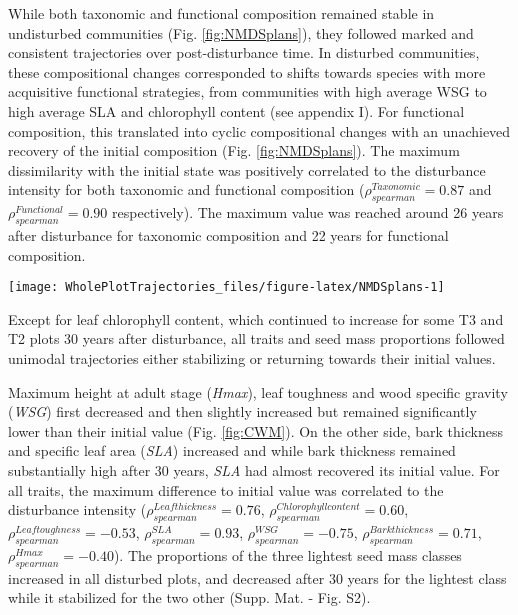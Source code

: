 \documentclass[fleqn,10pt]{ArtEcoFoG} %
\begin{document}
While both taxonomic and functional composition remained stable in
undisturbed communities (Fig. \ref{fig:NMDSplans}), they followed marked
and consistent trajectories over post-\break disturbance time. In
disturbed communities, these compositional changes corresponded to
shifts towards species with more acquisitive functional strategies, from
communities with high average WSG to high average SLA and chlorophyll
content (see appendix I). For functional composition, this translated
into cyclic compositional changes with an unachieved recovery of the
initial composition (Fig. \ref{fig:NMDSplans}). The maximum
dissimilarity with the initial state was positively correlated to the
disturbance intensity for both taxonomic and functional composition
(\(\rho_{spearman}^{Taxonomic}=0.87\) and
\(\rho_{spearman}^{Functional}=0.90\) respectively). The maximum value
was reached around 26 years after disturbance for taxonomic composition
and 22 years for functional composition.

\begin{figure*}

{\centering \texttt{[image: WholePlotTrajectories\_files/figure-latex/NMDSplans-1]} 

}

\caption{Plot trajectories in terms of flora composition (left panels \textbf{(a)} and \textbf{(c)}) and functional composition (right panels \textbf{(b)} and \textbf{(d)}) in a two-dimensional NMDS space. Lower panels (\textbf{(c)} and \textbf{(d)}) represent the Euclidean distance to initial condition along the 30 sampled years. Shaded areas are the credibility intervals.}\label{fig:NMDSplans}
\end{figure*}

Except for leaf chlorophyll content, which continued to increase for
some T3 and T2 plots 30 years after disturbance, all traits and seed
mass proportions followed unimodal trajectories either stabilizing or
returning towards their initial values.

Maximum height at adult stage (\emph{Hmax}), leaf toughness and wood
specific gravity (\emph{WSG}) first decreased and then slightly
increased but remained significantly lower than their initial value
(Fig. \ref{fig:CWM}). On the other side, bark thickness and specific
leaf area (\emph{SLA}) increased and while bark thickness remained
substantially high after 30 years, \emph{SLA} had almost recovered its
initial value. For all traits, the maximum difference to initial value
was correlated to the disturbance intensity
(\(\rho_{spearman}^{Leaf thickness}=0.76\),
\(\rho_{spearman}^{Chlorophyll content}=0.60\),
\(\rho_{spearman}^{Leaf toughness}=-0.53\),
\(\rho_{spearman}^{SLA}=0.93\), \(\rho_{spearman}^{WSG}=-0.75\),
\(\rho_{spearman}^{Bark thickness}=0.71\),
\(\rho_{spearman}^{Hmax}=-0.40\)). The proportions of the three lightest
seed mass classes increased in all disturbed plots, and decreased after
30 years for the lightest class while it stabilized for the two other
(Supp. Mat. - Fig. S2).
\end{document}
